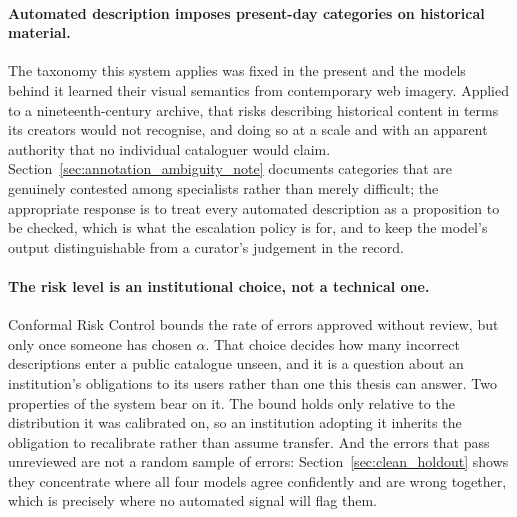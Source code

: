 \documentclass[12pt,a4paper]{report}
\begin{document}
\paragraph{Automated description imposes present-day categories on historical material.} The taxonomy this system applies was fixed in the present and the models behind it learned their visual semantics from contemporary web imagery. Applied to a nineteenth-century archive, that risks describing historical content in terms its creators would not recognise, and doing so at a scale and with an apparent authority that no individual cataloguer would claim. Section~\ref{sec:annotation_ambiguity_note} documents categories that are genuinely contested among specialists rather than merely difficult; the appropriate response is to treat every automated description as a proposition to be checked, which is what the escalation policy is for, and to keep the model's output distinguishable from a curator's judgement in the record.

\paragraph{The risk level is an institutional choice, not a technical one.} Conformal Risk Control bounds the rate of errors approved without review, but only once someone has chosen $\alpha$. That choice decides how many incorrect descriptions enter a public catalogue unseen, and it is a question about an institution's obligations to its users rather than one this thesis can answer. Two properties of the system bear on it. The bound holds only relative to the distribution it was calibrated on, so an institution adopting it inherits the obligation to recalibrate rather than assume transfer. And the errors that pass unreviewed are not a random sample of errors: Section~\ref{sec:clean_holdout} shows they concentrate where all four models agree confidently and are wrong together, which is precisely where no automated signal will flag them.
\end{document}

